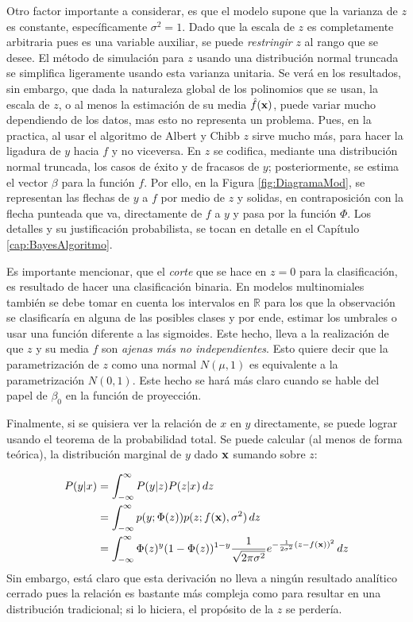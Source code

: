 \documentclass[../Main/Main.tex]{subfiles}
\begin{document}
Otro factor importante a considerar, es que el modelo supone que la varianza de $z$ es constante, específicamente $\sigma^2 = 1$. Dado que la escala de $z$ es completamente arbitraria pues es una variable auxiliar, se puede \textit{restringir} $z$ al rango que se desee. El método de simulación para $z$ usando una distribución normal truncada se simplifica ligeramente usando esta varianza unitaria. Se verá en los resultados, sin embargo, que dada la naturaleza global de los polinomios que se usan, la escala de $z$, o al menos la estimación de su media $\hat{f}(\mathbf{x})$, puede variar mucho dependiendo de los datos, mas esto no representa un problema. Pues, en la practica, al  usar el algoritmo de Albert y Chibb $z$ sirve mucho más, para hacer la ligadura de $y$ hacia $f$ y no viceversa. En $z$ se codifica, mediante una distribución normal truncada, los casos de éxito y de fracasos de $y$; posteriormente, se estima el vector $\beta$ para la función $f$. Por ello, en la Figura \ref{fig:DiagramaMod}, se representan las flechas de $y$ a $f$ por medio de $z$ y solidas, en contraposición con la flecha punteada que va, directamente de $f$ a $y$ y pasa por la función $\Phi$. Los detalles y su justificación probabilista, se tocan en detalle en el Capítulo \ref{cap:BayesAlgoritmo}.

Es importante mencionar, que el \textit{corte} que se hace en $z = 0$ para la clasificación, es resultado de hacer una clasificación binaria. En modelos multinomiales también se debe tomar en cuenta los intervalos en $\mathbb{R}$ para los que la observación se clasificaría en alguna de las posibles clases y por ende, estimar los umbrales o usar una función diferente a las sigmoides. Este hecho, lleva a la realización de que $z$ y su media $f$ son \textit{ajenas más no independientes}. Esto quiere decir que la parametrización de $z$ como una normal $N(\mu,1)$ es equivalente a la parametrización $N(0,1)$. Este hecho se hará más claro cuando se hable del papel de $\beta_0$ en la función de proyección.

Finalmente, si se quisiera ver la relación de $x$ en $y$ directamente, se puede lograr usando el teorema de la probabilidad total. Se puede calcular (al menos de forma teórica), la distribución marginal de $y$ dado $\mathbf{x}$ sumando sobre $z$:

\begin{align*}
P(y|x) 	&= \int_{-\infty}^\infty P(y|z)P(z|x)\, dz \\
		&= \int_{-\infty}^\infty p(y;\Phi(z))p(z;f(\mathbf{x}),\sigma^2)\, dz \\
		&= \int_{-\infty}^\infty \Phi(z)^y (1-\Phi(z))^{1-y}
		\dfrac{1}{\sqrt{2\pi\sigma^2}}e^{-\frac{1}{2\sigma^2}(z-f(\mathbf{x}))^2} \, dz
\end{align*}
Sin embargo, está claro que esta derivación no lleva a ningún resultado analítico cerrado pues la relación es bastante más compleja como para resultar en una distribución  tradicional; si lo hiciera, el propósito de la $z$ se perdería.
\end{document}

